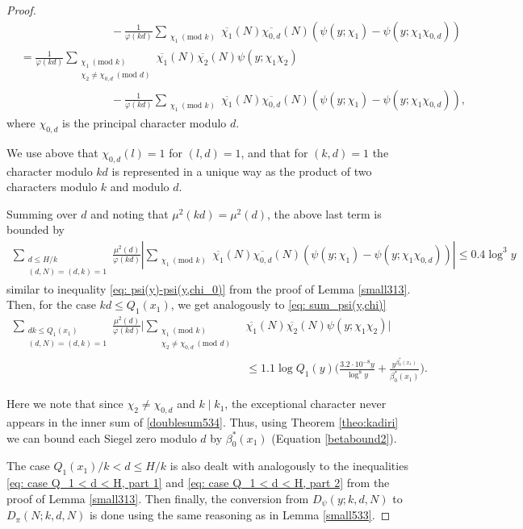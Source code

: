 \documentclass[12pt]{amsart}
\begin{document}
\begin{proof}
\begin{align*}
        &\qquad\qquad\qquad\qquad-\frac{1}{\varphi(kd)}\sum_{\substack{\chi_1\:(\text{mod } k)}}\overline{\chi_1}(N)\overline{\chi_{0,d}}(N)\left(\psi(y;\chi_1)-\psi(y;\chi_1 \chi_{0,d})\right) \\
        &=\frac{1}{\varphi(kd)}
        \sum_{\substack{\chi_1\:(\text{mod } k) \\ \chi_2\ne \chi_{0,d}\: (\text{mod }d)}}\overline{\chi_1}(N)\overline{\chi_2}(N)\psi(y;\chi_1\chi_2) \\
        &\qquad\qquad\qquad\qquad-\frac{1}{\varphi(kd)}\sum_{\substack{\chi_1\:(\text{mod } k)}}\overline{\chi_1}(N)\overline{\chi_{0,d}}(N)\left(\psi(y;\chi_1)-\psi(y;\chi_1 \chi_{0,d})\right),
    \end{align*}
    where $\chi_{0,d}$ is the principal character modulo $d$.

We use above that $\chi_{0,d}(l)=1$ for $(l,d)=1$, and that for $(k,d)=1$ the character modulo $kd$ is represented in a unique way as the product of two characters modulo $k$ and modulo $d$.

Summing over $d$ and noting that $\mu^2(kd)=\mu^2(d)$, the above last term is bounded by 
\begin{align}
    \sum_{\substack{d\le H/k\\(d,N)=(d,k)=1}}\frac{\mu^2(d)}{\varphi(kd)}\left|\sum_{\substack{\chi_1\:(\text{mod } k)}}\overline{\chi_1}(N)\overline{\chi_{0,d}}(N)\left(\psi(y;\chi_1)-\psi(y;\chi_1 \chi_{0,d})\right)\right| \le 0.4\log^3 y \label{eq: 534error}
\end{align}
similar to inequality \eqref{eq: psi(y)-psi(y,chi_0)} from the proof of Lemma \ref{small313}.
Then, for the case $kd\le Q_1(x_1)$, we get analogously to \eqref{eq: sum_psi(y,chi)}
\begin{align}
    \sum_{\substack{dk \le Q_1(x_1) \\ (d,N)=(d, k)=1}} \frac{\mu^2(d)}{\varphi(kd)}
    \Bigg| \sum_{\substack{\chi_1\:(\text{mod } k) \\ \chi_2\ne \chi_{0,d}\: (\text{mod }d)}} & \overline{\chi_1}(N)\overline{\chi_2}(N)\psi(y;\chi_1\chi_2) \Bigg|\label{doublesum534}\\ 
    &\le 1.1\log Q_1(y) \Bigg(\frac{3.2\cdot 10^{-8}y}{\log^{8}y} + \frac{y^{\beta_0^*(x_1)}}{\beta_0^*(x_1)} \Bigg). \nonumber
\end{align}

Here we note that since $\chi_2\neq\chi_{0,d}$ and $k\mid k_1$, the exceptional character never appears in the inner sum of \eqref{doublesum534}. Thus, using Theorem \ref{theo:kadiri} we can bound each Siegel zero modulo $d$ by $\beta_0^*(x_1)$ (Equation \eqref{betabound2}).

The case $Q_1(x_1)/k < d \le H/k$ is also dealt with analogously to the inequalities \eqref{eq: case Q_1 < d < H, part 1} and \eqref{eq: case Q_1 < d < H, part 2} from the proof of Lemma \ref{small313}. Then finally, the conversion from $D_\psi(y;k,d,N)$ to $D_\pi(N;k,d,N)$ is done using the same reasoning as in Lemma \ref{small533}. 
\end{proof}
\end{document}

